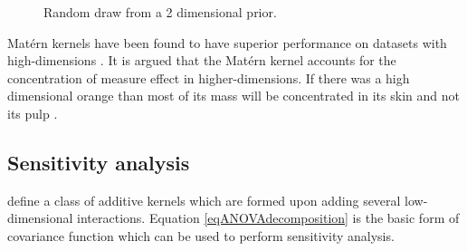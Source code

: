 \begin{figure}[!ht]
  \centering
    \quad
{}\quad
       \caption{Random draw from a 2 dimensional prior.}
       \label{figPrior2dimensional}
\end{figure}

Mat\'ern kernels have been found to have superior performance on datasets with high-dimensions \cite{le2013fastfood}. It is argued that the Mat\'ern kernel accounts for the concentration of measure effect in higher-dimensions. If there was a high dimensional orange than most of its mass will be concentrated in its skin and not its pulp \cite{domingos2012few}. 

\subsection{Sensitivity analysis}
\cite{duvenaud2011additive, durrande2013anova, chastaing2015anova} define a class of additive kernels which are formed upon adding several low-dimensional interactions. Equation \ref{eqANOVAdecomposition} is the basic form of covariance function which can be used to perform sensitivity analysis.

